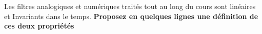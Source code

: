 \documentclass[11pt,a4paper]{article}
\begin{document}
 Les filtres analogiques et numériques traités tout au long du cours sont linéaires et Invariants dans le temps. \textbf{Proposez en quelques lignes une définition de ces deux propriétés}\\
\vspace{0.5cm}
\end{document}
